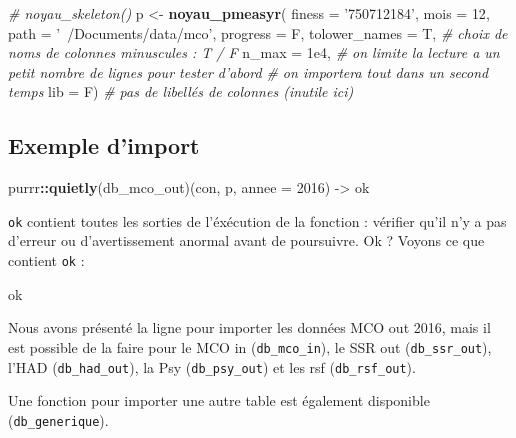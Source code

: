 \documentclass[]{book}
\newenvironment{Shaded}{\begin{snugshade}}{\end{snugshade}}
\newcommand{\KeywordTok}[1]{\textcolor[rgb]{0.13,0.29,0.53}{\textbf{#1}}}
\newcommand{\DataTypeTok}[1]{\textcolor[rgb]{0.13,0.29,0.53}{#1}}
\newcommand{\DecValTok}[1]{\textcolor[rgb]{0.00,0.00,0.81}{#1}}
\newcommand{\FloatTok}[1]{\textcolor[rgb]{0.00,0.00,0.81}{#1}}
\newcommand{\StringTok}[1]{\textcolor[rgb]{0.31,0.60,0.02}{#1}}
\newcommand{\CommentTok}[1]{\textcolor[rgb]{0.56,0.35,0.01}{\textit{#1}}}
\newcommand{\OperatorTok}[1]{\textcolor[rgb]{0.81,0.36,0.00}{\textbf{#1}}}
\newcommand{\NormalTok}[1]{#1}
\theoremstyle{definition}
\theoremstyle{definition}
\theoremstyle{definition}
\theoremstyle{remark}
\begin{document}
\begin{Shaded}
\begin{Highlighting}[]
\CommentTok{# noyau_skeleton()}
\NormalTok{p <-}\StringTok{ }\KeywordTok{noyau_pmeasyr}\NormalTok{(}
  \DataTypeTok{finess   =} \StringTok{'750712184'}\NormalTok{,}
  \DataTypeTok{mois     =} \DecValTok{12}\NormalTok{,}
  \DataTypeTok{path     =} \StringTok{'~/Documents/data/mco'}\NormalTok{,}
  \DataTypeTok{progress =}\NormalTok{ F, }
  \DataTypeTok{tolower_names =}\NormalTok{ T, }\CommentTok{# choix de noms de colonnes minuscules : T / F}
  \DataTypeTok{n_max =} \FloatTok{1e4}\NormalTok{, }\CommentTok{# on limite la lecture a un petit nombre de lignes pour tester d'abord }
  \CommentTok{# on importera tout dans un second temps}
  \DataTypeTok{lib =}\NormalTok{ F) }\CommentTok{# pas de libellés de colonnes (inutile ici)}
\end{Highlighting}
\end{Shaded}

\subsection{Exemple d'import}\label{exemple-dimport}

\begin{Shaded}
\begin{Highlighting}[]
\NormalTok{purrr}\OperatorTok{::}\KeywordTok{quietly}\NormalTok{(db_mco_out)(con,  p, }\DataTypeTok{annee =} \DecValTok{2016}\NormalTok{) ->}\StringTok{ }\NormalTok{ok }
\end{Highlighting}
\end{Shaded}

\texttt{ok} contient toutes les sorties de l'éxécution de la fonction :
vérifier qu'il n'y a pas d'erreur ou d'avertissement anormal avant de
poursuivre. Ok ? Voyons ce que contient \texttt{ok} :

\begin{Shaded}
\begin{Highlighting}[]
\NormalTok{ok}
\end{Highlighting}
\end{Shaded}

Nous avons présenté la ligne pour importer les données MCO out 2016,
mais il est possible de la faire pour le MCO in (\texttt{db\_mco\_in}),
le SSR out (\texttt{db\_ssr\_out}), l'HAD (\texttt{db\_had\_out}), la
Psy (\texttt{db\_psy\_out}) et les rsf (\texttt{db\_rsf\_out}).

Une fonction pour importer une autre table est également disponible
(\texttt{db\_generique}).
\end{document}
